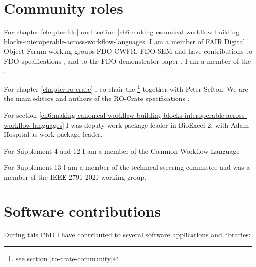 \section{Community roles}

For chapter \ref{chapter:fdo} and section \ref{ch6:making-canonical-workflow-building-blocks-interoperable-across-workflow-languages} I am a member of FAIR Digital Object Forum \cite{FAIRDigitalObjects} working groups FDO-CWFR, FDO-SEM and have contributions to FDO specifications \cite{fdo-RequirementSpec,fdo-Overview}, and to the FDO demonstrator paper \cite{wittenburgFAIRDigitalObject2022b}. I am a member of the .

For chapter \ref{chapter:ro-crate} I co-chair the \footnote{see section \vref{ro-crate-community}} together with Peter Sefton. We are the main editors and authors of the RO-Crate specifications \cite{ch5-105,ch5-107,rocrate1.1}.

For section \ref{ch6:making-canonical-workflow-building-blocks-interoperable-across-workflow-languages} I was deputy work package leader in BioExcel-2, with Adam
Hospital as work package leader.

For Supplement 4 and 12 I am a member of the Common Workflow Language

For Supplement 13 I am a member of the
 technical
steering committee and was a member of the IEEE 2791-2020 working
group.

\section{Software contributions}

During this PhD I have contributed to several software applications and libraries:

